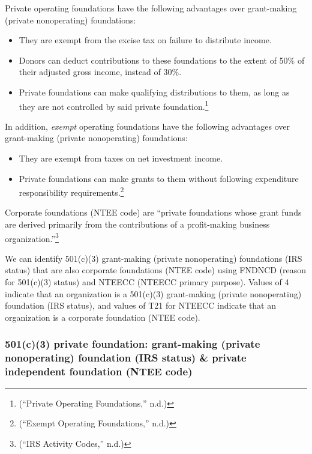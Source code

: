 \documentclass[
  letterpaper,
  DIV=11,
  numbers=noendperiod]{scrreprt}
\providecommand{\tightlist}{%
  \setlength{\itemsep}{0pt}\setlength{\parskip}{0pt}}\usepackage{longtable,booktabs,array}
\begin{document}
Private operating foundations have the following advantages over
grant-making (private nonoperating) foundations:

\begin{itemize}
\tightlist
\item
  They are exempt from the excise tax on failure to distribute income.
\item
  Donors can deduct contributions to these foundations to the extent of
  50\% of their adjusted gross income, instead of 30\%.
\item
  Private foundations can make qualifying distributions to them, as long
  as they are not controlled by said private foundation.\footnote{({``Private
    Operating Foundations,''} n.d.)}
\end{itemize}

In addition, \emph{exempt} operating foundations have the following
advantages over grant-making (private nonoperating) foundations:

\begin{itemize}
\tightlist
\item
  They are exempt from taxes on net investment income.
\item
  Private foundations can make grants to them without following
  expenditure responsibility requirements.\footnote{({``Exempt Operating
    Foundations,''} n.d.)}
\end{itemize}

Corporate foundations (NTEE code) are ``private foundations whose grant
funds are derived primarily from the contributions of a profit-making
business organization.''\footnote{({``IRS Activity Codes,''} n.d.)}

We can identify 501(c)(3) grant-making (private nonoperating)
foundations (IRS status) that are also corporate foundations (NTEE code)
using FNDNCD (reason for 501(c)(3) status) and NTEECC (NTEECC primary
purpose). Values of 4 indicate that an organization is a 501(c)(3)
grant-making (private nonoperating) foundation (IRS status), and values
of T21 for NTEECC indicate that an organization is a corporate
foundation (NTEE code).

\hypertarget{c3-private-foundation-grant-making-private-nonoperating-foundation-irs-status-private-independent-foundation-ntee-code}{%
\subsubsection{501(c)(3) private foundation: grant-making (private
nonoperating) foundation (IRS status) \& private independent foundation
(NTEE
code)}\label{c3-private-foundation-grant-making-private-nonoperating-foundation-irs-status-private-independent-foundation-ntee-code}}
\end{document}
